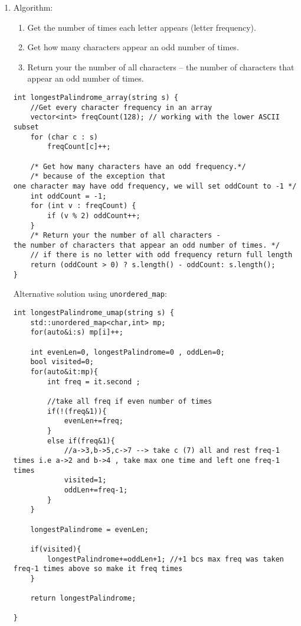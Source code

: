 \documentclass[11pt]{article}
\begin{document}
\begin{enumerate}
\item Algorithm:
\label{sec:org143f1ef}
\begin{enumerate}
\item Get the number of times each letter appears (letter frequency).
\item Get how many characters appear an odd number of times.
\item Return your the number of all characters -- the number of characters that appear an odd number of times.
\end{enumerate}

\begin{verbatim}
int longestPalindrome_array(string s) {
    //Get every character frequency in an array
    vector<int> freqCount(128); // working with the lower ASCII subset
    for (char c : s)
        freqCount[c]++;

    /* Get how many characters have an odd frequency.*/
    /* because of the exception that
one character may have odd frequency, we will set oddCount to -1 */
    int oddCount = -1;
    for (int v : freqCount) {
        if (v % 2) oddCount++;
    }
    /* Return your the number of all characters -
the number of characters that appear an odd number of times. */
    // if there is no letter with odd frequency return full length
    return (oddCount > 0) ? s.length() - oddCount: s.length();
}
\end{verbatim}

Alternative solution using \texttt{unordered\_map}:

\begin{verbatim}
int longestPalindrome_umap(string s) {
    std::unordered_map<char,int> mp;
    for(auto&i:s) mp[i]++;

    int evenLen=0, longestPalindrome=0 , oddLen=0;
    bool visited=0;
    for(auto&it:mp){
        int freq = it.second ;

        //take all freq if even number of times
        if(!(freq&1)){
            evenLen+=freq;
        }
        else if(freq&1){
            //a->3,b->5,c->7 --> take c (7) all and rest freq-1 times i.e a->2 and b->4 , take max one time and left one freq-1 times
            visited=1;
            oddLen+=freq-1;
        }
    }

    longestPalindrome = evenLen;

    if(visited){
        longestPalindrome+=oddLen+1; //+1 bcs max freq was taken freq-1 times above so make it freq times
    }

    return longestPalindrome;

}
\end{verbatim}
\end{enumerate}
\end{document}
